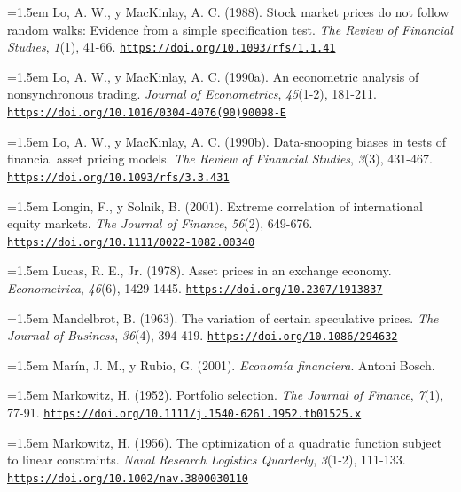 \documentclass[10pt,a4paper]{article}
\begin{document}
\noindent\hangindent=1.5em Lo, A. W., y MacKinlay, A. C. (1988). Stock market prices do not follow random walks: Evidence from a simple specification test. \textit{The Review of Financial Studies}, \textit{1}(1), 41-66. \href{https://doi.org/10.1093/rfs/1.1.41}{\nolinkurl{https://doi.org/10.1093/rfs/1.1.41}}

\noindent\hangindent=1.5em Lo, A. W., y MacKinlay, A. C. (1990a). An econometric analysis of nonsynchronous trading. \textit{Journal of Econometrics}, \textit{45}(1-2), 181-211. \href{https://doi.org/10.1016/0304-4076(90)90098-E}{\nolinkurl{https://doi.org/10.1016/0304-4076(90)90098-E}}

\noindent\hangindent=1.5em Lo, A. W., y MacKinlay, A. C. (1990b). Data-snooping biases in tests of financial asset pricing models. \textit{The Review of Financial Studies}, \textit{3}(3), 431-467. \href{https://doi.org/10.1093/rfs/3.3.431}{\nolinkurl{https://doi.org/10.1093/rfs/3.3.431}}

\noindent\hangindent=1.5em Longin, F., y Solnik, B. (2001). Extreme correlation of international equity markets. \textit{The Journal of Finance}, \textit{56}(2), 649-676. \href{https://doi.org/10.1111/0022-1082.00340}{\nolinkurl{https://doi.org/10.1111/0022-1082.00340}}

\noindent\hangindent=1.5em Lucas, R. E., Jr. (1978). Asset prices in an exchange economy. \textit{Econometrica}, \textit{46}(6), 1429-1445. \href{https://doi.org/10.2307/1913837}{\nolinkurl{https://doi.org/10.2307/1913837}}

\noindent\hangindent=1.5em Mandelbrot, B. (1963). The variation of certain speculative prices. \textit{The Journal of Business}, \textit{36}(4), 394-419. \href{https://doi.org/10.1086/294632}{\nolinkurl{https://doi.org/10.1086/294632}}

\noindent\hangindent=1.5em Marín, J. M., y Rubio, G. (2001). \textit{Economía financiera}. Antoni Bosch.

{\sloppy\noindent\hangindent=1.5em Markowitz, H. (1952). Portfolio selection. \textit{The Journal of Finance}, \textit{7}(1), 77-91. \href{https://doi.org/10.1111/j.1540-6261.1952.tb01525.x}{\nolinkurl{https://doi.org/10.1111/j.1540-6261.1952.tb01525.x}}\par}

\noindent\hangindent=1.5em Markowitz, H. (1956). The optimization of a quadratic function subject to linear constraints. \textit{Naval Research Logistics Quarterly}, \textit{3}(1-2), 111-133. \href{https://doi.org/10.1002/nav.3800030110}{\nolinkurl{https://doi.org/10.1002/nav.3800030110}}
\end{document}
